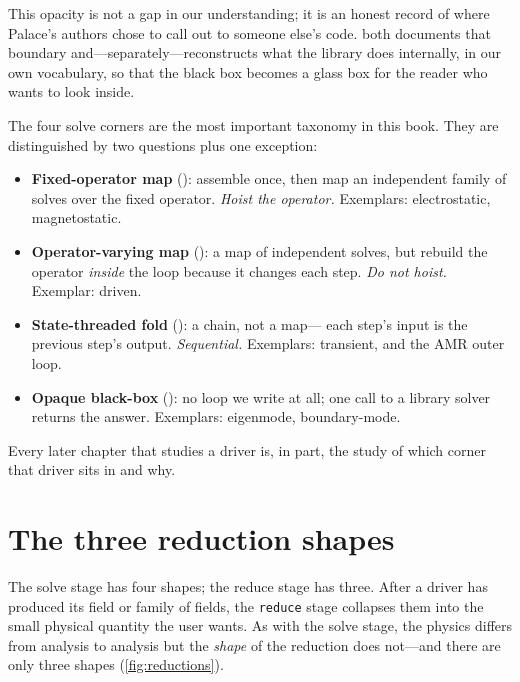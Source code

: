 This opacity is not a gap in our understanding; it is an honest record of where
Palace's authors chose to call out to someone else's code. 
both documents that boundary and---separately---reconstructs what the library
does internally, in our own vocabulary, so that the black box becomes a glass
box for the reader who wants to look inside.

\begin{keyidea}
The four solve corners are the most important taxonomy in this book. They are
distinguished by two questions plus one exception:
\begin{itemize}[nosep]
  \item \textbf{Fixed-operator map} (): assemble once, then
  map an independent family of solves over the fixed operator. \emph{Hoist the
  operator.} Exemplars: electrostatic, magnetostatic.
  \item \textbf{Operator-varying map} (): a map of
  independent solves, but rebuild the operator \emph{inside} the loop because it
  changes each step. \emph{Do not hoist.} Exemplar: driven.
  \item \textbf{State-threaded fold} (): a chain, not a map---
  each step's input is the previous step's output. \emph{Sequential.}
  Exemplars: transient, and the AMR outer loop.
  \item \textbf{Opaque black-box} (): no loop we write at all;
  one call to a library solver returns the answer. Exemplars: eigenmode,
  boundary-mode.
\end{itemize}
Every later chapter that studies a driver is, in part, the study of which corner
that driver sits in and why.
\end{keyidea}

\section{The three reduction shapes}

The solve stage has four shapes; the reduce stage has three. After a driver has
produced its field or family of fields, the \texttt{reduce} stage collapses
them into the small physical quantity the user wants. As with the solve stage,
the physics differs from analysis to analysis but the \emph{shape} of the
reduction does not---and there are only three shapes (\cref{fig:reductions}).

